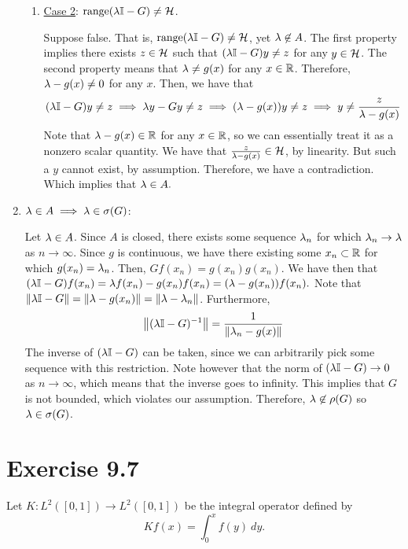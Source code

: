 \begin{solution}
\begin{enumerate}
\begin{enumerate}
        \item[] \underline{Case 2}: $\text{range} (\mathrm{\lambda}\mathbb{I} - G) \neq \mathcal{H}$.

            Suppose false. That is, $\text{range} (\mathrm{\lambda}\mathbb{I} - G) \neq \mathcal{H}$, yet $\mathrm{\lambda} \not \in A$. The first property implies there exists $z \in \mathcal{H}$ such that $(\mathrm{\lambda}\mathbb{I} - G)y \neq z$ for any $y \in \mathcal{H}$. The second property means that $\mathrm{\lambda}\neq g(x)$ for any $x \in \mathbb{R}$. Therefore, $\mathrm{\lambda} - g(x) \neq 0$ for any $x$. Then, we have that
            \[(\mathrm{\lambda}\mathbb{I} - G)y \neq z \implies \mathrm{\lambda} y - Gy \neq z \implies (\mathrm{\lambda} - g(x))y \neq z \implies y \neq \frac{z}{\mathrm{\lambda} - g(x)}\]
            Note that $\mathrm{\lambda} - g(x) \in \mathbb{R}$ for any $x \in \mathbb{R}$, so we can essentially treat it as a nonzero scalar quantity. We have that $\frac{z}{\mathrm{\lambda} - g(x)} \in \mathcal{H}$, by linearity. But such a $y$ cannot exist, by assumption. Therefore, we have a contradiction. Which implies that $\mathrm{\lambda} \in A.$
        \end{enumerate}

        \item[] \underline{$\mathrm{\lambda} \in A \implies \mathrm{\lambda} \in \sigma(G)$}:

        \hop
        Let $\mathrm{\lambda} \in A$. Since $A$ is closed, there exists some sequence $\mathrm{\lambda}_n$ for which $\mathrm{\lambda}_n \to \mathrm{\lambda}$ as $n \to \infty$. Since $g$ is continuous, we have there existing some $x_n \subset \mathbb{R}$ for which $g(x_n) = \mathrm{\lambda}_n$. Then, $Gf(x_n) = g(x_n)g(x_n)$. We have then that $(\mathrm{\lambda}\mathbb{I} - G)f(x_n) = \mathrm{\lambda} f(x_n) - g(x_n)f(x_n) = (\mathrm{\lambda} - g(x_n))f(x_n).$ Note that $\norm{\mathrm{\lambda}\mathbb{I} - G} = \norm{\mathrm{\lambda} - g(x_n)} = \norm{\mathrm{\lambda} - \mathrm{\lambda}_n}$. Furthermore, 
        \[\norm{(\mathrm{\lambda}\mathbb{I} - G)^{-1}} = \frac{1}{\norm{\mathrm{\lambda}_n  - g(x)}}\]
        The inverse of $(\mathrm{\lambda}\mathbb{I} - G)$ can be taken, since we can arbitrarily pick some sequence with this restriction. Note however that the norm of $(\mathrm{\lambda}\mathbb{I} - G) \to 0$ as $n \to \infty$, which means that the inverse goes to infinity. This implies that $G$ is not bounded, which violates our assumption. Therefore, $\mathrm{\lambda} \not \in\rho(G)$ so $\mathrm{\lambda} \in \sigma(G)$. 
    \end{enumerate}
\end{solution}


\newpage
\section{Exercise 9.7}
Let $K : L^2([0, 1]) \to L^2([0, 1])$ be the integral operator defined by 
\[Kf(x) = \int_0^x f(y) \ dy.\]
